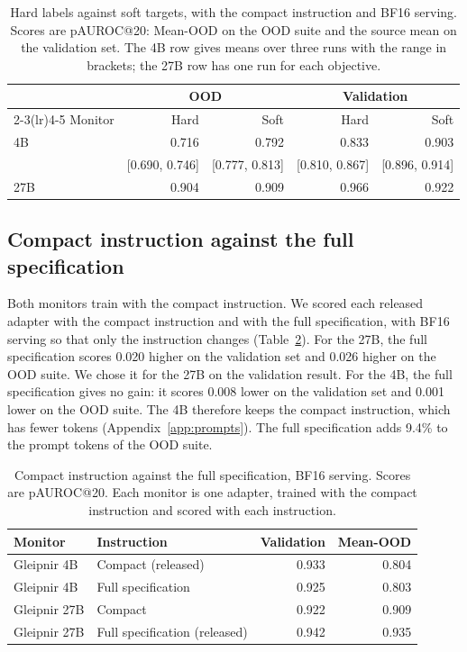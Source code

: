 \begin{table}[h]
\caption{Hard labels against soft targets, with the compact instruction and BF16 serving. Scores are pAUROC@20: Mean-OOD on the OOD suite and the source mean on the validation set. The 4B row gives means over three runs with the range in brackets; the 27B row has one run for each objective.}
\label{tab:hard-soft}
\centering
\small
\begin{tabular}{lrrrr}
\toprule
 & \multicolumn{2}{c}{OOD} & \multicolumn{2}{c}{Validation} \\
\cmidrule(lr){2-3}\cmidrule(lr){4-5}
Monitor & Hard & Soft & Hard & Soft \\
\midrule
4B & 0.716 & 0.792 & 0.833 & 0.903 \\
 & {\scriptsize [0.690, 0.746]} & {\scriptsize [0.777, 0.813]} & {\scriptsize [0.810, 0.867]} & {\scriptsize [0.896, 0.914]} \\
27B & 0.904 & 0.909 & 0.966 & 0.922 \\
\bottomrule
\end{tabular}
\end{table}

\subsection{Compact instruction against the full specification}
\label{app:ablation-instruction}

Both monitors train with the compact instruction.
We scored each released adapter with the compact instruction and with the full specification, with BF16 serving so that only the instruction changes (Table~\ref{tab:instruction}).
For the 27B, the full specification scores 0.020 higher on the validation set and 0.026 higher on the OOD suite.
We chose it for the 27B on the validation result.
For the 4B, the full specification gives no gain: it scores 0.008 lower on the validation set and 0.001 lower on the OOD suite.
The 4B therefore keeps the compact instruction, which has fewer tokens (Appendix~\ref{app:prompts}).
The full specification adds 9.4\% to the prompt tokens of the OOD suite.

\begin{table}[h]
\caption{Compact instruction against the full specification, BF16 serving. Scores are pAUROC@20. Each monitor is one adapter, trained with the compact instruction and scored with each instruction.}
\label{tab:instruction}
\centering
\small
\begin{tabular}{@{}llrr@{}}
\toprule
Monitor & Instruction & Validation & Mean-OOD \\
\midrule
Gleipnir 4B & Compact (released) & 0.933 & 0.804 \\
Gleipnir 4B & Full specification & 0.925 & 0.803 \\
Gleipnir 27B & Compact & 0.922 & 0.909 \\
Gleipnir 27B & Full specification (released) & 0.942 & 0.935 \\
\bottomrule
\end{tabular}
\end{table}

